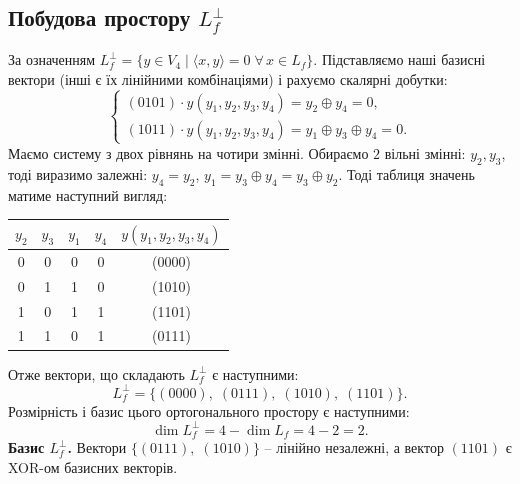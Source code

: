 \subsection{Побудова простору \texorpdfstring{$L_{f}^{\perp}$}{L}}
За означенням $L_{f}^{\perp} = \{y \in V_{4} \mid \langle x, y \rangle = 0 \; \forall \, x \in L_{f}\}$. Підставляємо 
наші базисні вектори (інші є їх лінійними комбінаціями) і рахуємо скалярні добутки:
\begin{equation*}
    \begin{cases}
        (0101) \cdot y \left(y_{1}, y_{2}, y_{3}, y_{4}\right) = y_{2} \oplus y_{4} = 0, \\
        (1011) \cdot y \left(y_{1}, y_{2}, y_{3}, y_{4}\right) = y_{1} \oplus y_{3} \oplus y_{4} = 0.
    \end{cases}
\end{equation*}
Маємо систему з двох рівнянь на чотири змінні. Обираємо $2$ вільні змінні: $y_{2}, y_{3}$, тоді виразимо залежні: 
$y_{4} = y_{2}$, $y_{1} = y_{3} \oplus y_{4} = y_{3} \oplus y_{2}$. Тоді таблиця значень матиме наступний вигляд:
\begin{center}
    \renewcommand{\arraystretch}{1.2}
    \begin{tabular}{cc|ccc}
        $y_{2}$ & $y_{3}$ & $y_{1}$ & $y_{4}$ & $y \left(y_{1}, y_{2}, y_{3}, y_{4}\right)$ \\
        \hline
        0       & 0       & 0       & 0       & (0000)                                      \\
        0       & 1       & 1       & 0       & (1010)                                      \\
        1       & 0       & 1       & 1       & (1101)                                      \\
        1       & 1       & 0       & 1       & (0111)                                      \\
    \end{tabular}
\end{center}
Отже вектори, що складають $L_{f}^{\perp}$ є наступними:
\begin{equation*}
    L_{f}^{\perp} = \{(0000),\; (0111),\; (1010),\; (1101)\}.
\end{equation*}
Розмірність і базис цього ортогонального простору є наступними:
\begin{equation*}
    \dim L_{f}^{\perp} = 4 - \dim L_{f} = 4 - 2 = 2.
\end{equation*}
\textbf{Базис $L_{f}^{\perp}$.} Вектори $\{(0111),\; (1010)\}$ -- лінійно незалежні, а вектор $(1101)$ є XOR-ом 
базисних векторів.

